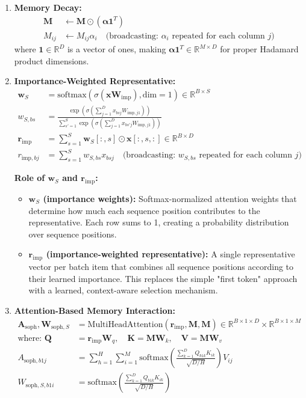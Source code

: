 \documentclass{article}
\begin{document}
\begin{enumerate}
\item \textbf{Memory Decay:}
\begin{align}
\mathbf{M} &\leftarrow \mathbf{M} \odot (\boldsymbol{\alpha} \mathbf{1}^T) \\
M_{ij} &\leftarrow M_{ij} \alpha_i \quad \text{(broadcasting: $\alpha_i$ repeated for each column $j$)}
\end{align}
where $\mathbf{1} \in \mathbb{R}^{D}$ is a vector of ones, making $\boldsymbol{\alpha} \mathbf{1}^T \in \mathbb{R}^{M \times D}$ for proper Hadamard product dimensions.

\item \textbf{Importance-Weighted Representative:}
\begin{align}
\mathbf{w}_S &= \text{softmax}(\sigma(\mathbf{x} \mathbf{W}_{\text{imp}}), \text{dim}=1) \in \mathbb{R}^{B \times S} \\
w_{S,bs} &= \frac{\exp(\sigma(\sum_{j=1}^{D} x_{bsj} W_{\text{imp},j1}))}{\sum_{s'=1}^{S} \exp(\sigma(\sum_{j=1}^{D} x_{bs'j} W_{\text{imp},j1}))} \\
\mathbf{r}_{\text{imp}} &= \sum_{s=1}^{S} \mathbf{w}_S[:, s] \odot \mathbf{x}[:, s, :] \in \mathbb{R}^{B \times D} \\
r_{\text{imp},bj} &= \sum_{s=1}^{S} w_{S,bs} x_{bsj} \quad \text{(broadcasting: $w_{S,bs}$ repeated for each column $j$)}
\end{align}

\textbf{Role of $\mathbf{w}_S$ and $\mathbf{r}_{\text{imp}}$:}
\begin{itemize}
\item \textbf{$\mathbf{w}_S$ (importance weights):} Softmax-normalized attention weights that determine how much each sequence position contributes to the representative. Each row sums to 1, creating a probability distribution over sequence positions.
\item \textbf{$\mathbf{r}_{\text{imp}}$ (importance-weighted representative):} A single representative vector per batch item that combines all sequence positions according to their learned importance. This replaces the simple "first token" approach with a learned, context-aware selection mechanism.
\end{itemize}

\item \textbf{Attention-Based Memory Interaction:}
\begin{align}
\mathbf{A}_{\text{soph}}, \mathbf{W}_{\text{soph},S} &= \text{MultiHeadAttention}(\mathbf{r}_{\text{imp}}, \mathbf{M}, \mathbf{M}) \in \mathbb{R}^{B \times 1 \times D} \times \mathbb{R}^{B \times 1 \times M} \\
\text{where: } \mathbf{Q} &= \mathbf{r}_{\text{imp}} \mathbf{W}_q, \quad \mathbf{K} = \mathbf{M} \mathbf{W}_k, \quad \mathbf{V} = \mathbf{M} \mathbf{W}_v \\
A_{\text{soph},b1j} &= \sum_{h=1}^{H} \sum_{i=1}^{M} \text{softmax}\left(\frac{\sum_{k=1}^{D} Q_{b1k} K_{ik}}{\sqrt{D/H}}\right) V_{ij} \\
W_{\text{soph},S,b1i} &= \text{softmax}\left(\frac{\sum_{k=1}^{D} Q_{b1k} K_{ik}}{\sqrt{D/H}}\right)
\end{align}


\end{enumerate}
\end{document}
